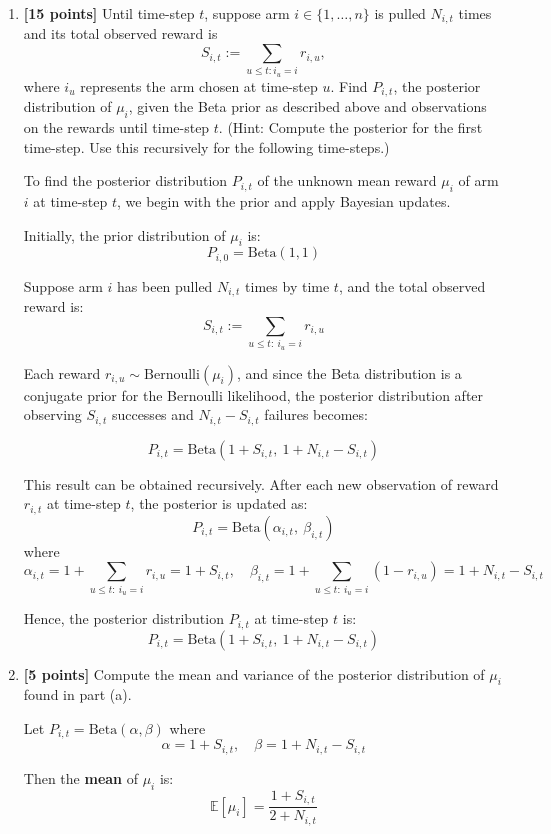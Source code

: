 \documentclass[a3paper,12pt]{extarticle} %
\begin{document}
\begin{enumerate}
    \item \textbf{[15 points]} Until time-step $t$, suppose arm $i \in \{1, \ldots, n\}$ is pulled $N_{i,t}$ times and its total observed reward is 
    \[
    S_{i,t} := \sum_{u \leq t : i_u = i} r_{i,u},
    \]
    where $i_u$ represents the arm chosen at time-step $u$. Find $P_{i,t}$, the posterior distribution of $\mu_i$, given the Beta prior as described above and observations on the rewards until time-step $t$. 
    (Hint: Compute the posterior for the first time-step. Use this recursively for the following time-steps.)

    To find the posterior distribution $P_{i,t}$ of the unknown mean reward $\mu_i$ of arm $i$ at time-step $t$, we begin with the prior and apply Bayesian updates.

Initially, the prior distribution of $\mu_i$ is:
\[
P_{i,0} = \text{Beta}(1, 1)
\]

Suppose arm $i$ has been pulled $N_{i,t}$ times by time $t$, and the total observed reward is:
\[
S_{i,t} := \sum_{u \leq t:\ i_u = i} r_{i,u}
\]

Each reward $r_{i,u} \sim \text{Bernoulli}(\mu_i)$, and since the Beta distribution is a conjugate prior for the Bernoulli likelihood, the posterior distribution after observing $S_{i,t}$ successes and $N_{i,t} - S_{i,t}$ failures becomes:

\[
P_{i,t} = \text{Beta}(1 + S_{i,t},\ 1 + N_{i,t} - S_{i,t})
\]

This result can be obtained recursively. After each new observation of reward $r_{i,t}$ at time-step $t$, the posterior is updated as:
\[
P_{i,t} = \text{Beta}(\alpha_{i,t},\ \beta_{i,t})
\]
where
\[
\alpha_{i,t} = 1 + \sum_{u \leq t:\ i_u = i} r_{i,u} = 1 + S_{i,t}, \quad
\beta_{i,t} = 1 + \sum_{u \leq t:\ i_u = i} (1 - r_{i,u}) = 1 + N_{i,t} - S_{i,t}
\]

Hence, the posterior distribution $P_{i,t}$ at time-step $t$ is:
\[
\boxed{
P_{i,t} = \text{Beta}(1 + S_{i,t},\ 1 + N_{i,t} - S_{i,t})
}
\]


    \item \textbf{[5 points]} Compute the mean and variance of the posterior distribution of $\mu_i$ found in part (a).

Let $P_{i,t} = \text{Beta}(\alpha, \beta)$ where
\[
\alpha = 1 + S_{i,t}, \quad \beta = 1 + N_{i,t} - S_{i,t}
\]

Then the \textbf{mean} of $\mu_i$ is:
\[
\mathbb{E}[\mu_i] = \frac{1 + S_{i,t}}{2 + N_{i,t}}
\]


\end{enumerate}
\end{document}
